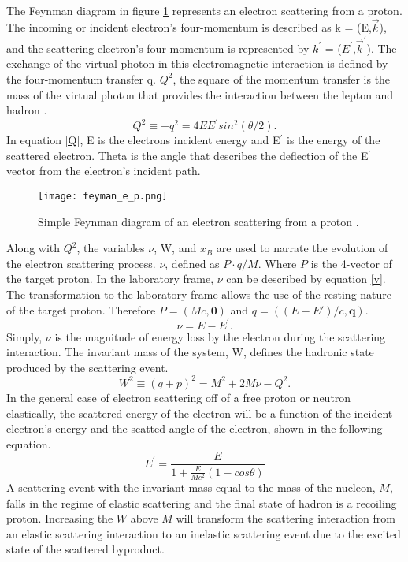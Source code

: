 \paragraph{} The Feynman diagram in figure \ref{feynman} represents an electron scattering from a proton. The incoming or incident electron's four-momentum is described as k = (E,$ \vec{k}$), and the scattering electron's four-momentum is represented by $k^\prime{}$ = ($E^\prime{}$,$\vec{k}^\prime{}$). The exchange of the virtual photon in this electromagnetic interaction is defined by the four-momentum transfer q. $Q^2$, the square of the momentum transfer is the mass of the virtual photon that provides the interaction between the lepton and hadron \cite{sane}. 
\begin{equation}
\label{Q}
Q^2 \equiv -q^2 = 4EE^\prime{} sin^2(\theta/2).
\end{equation} 
In equation \ref{Q}, E is the electrons incident energy and E$^\prime$ is the energy of the scattered electron. Theta is the angle that describes the deflection of the E$^\prime$ vector from the electron's incident path. 
\begin{figure}[h]
\centering
\caption{Simple Feynman diagram of an electron scattering from a proton \cite{Flay}.}
\texttt{[image: feyman\_e\_p.png]}
\label{feynman}
\end{figure}
Along with $Q^2$, the variables $\nu$, W, and $x_B$  are used to narrate the evolution of the electron scattering process. $\nu$, defined as $P\cdot q/M$. Where $P$ is the 4-vector of the target proton. In the laboratory frame, $\nu$ can be described by equation \ref{v}. The transformation to the laboratory frame allows the use of the resting nature of the target proton. Therefore $P = (Mc,\boldsymbol{0})$ and $ q = (( E-E\prime)/c,\boldsymbol{q})$. 
\begin{equation}
\label{v}
\nu = E - E^\prime{}.
\end{equation}
Simply, $\nu$ is the magnitude of energy loss by the electron during the scattering interaction. The invariant mass of the system, W,  defines the hadronic state produced by the scattering event. 
\begin{equation}
\label{W}
W^2 \equiv (q + p)^2 = M^2 + 2M\nu -Q^2.
\end{equation}
In the general case of electron scattering off of a free proton or neutron elastically, the scattered energy of the electron will be a function of the incident electron's energy and the scatted angle of the electron, shown in the following equation.
\begin{equation}
E^\prime =\frac{E}{1+\frac{E}{Mc^2}(1-cos\theta)}
\end{equation}
A scattering event with the invariant mass equal to the mass of the nucleon, $M$, falls in the regime of elastic scattering and the final state of hadron is a recoiling proton. Increasing the $W$ above $M$ will transform the scattering interaction from an elastic scattering interaction to an inelastic scattering event due to the excited state of the scattered byproduct. 
